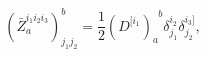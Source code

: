 \begin{equation}
\left( \bar{Z}_{a}^{i_{1}i_{2}i_{3}}\right) _{j_{1}j_{2}}^{b}=\frac{1}{2}%
\left( D^{[i_{1}}\right) _{a}^{\;\;b}\delta _{j_{1}}^{i_{2}}\delta
_{j_{2}}^{i_{3}]},  \label{i21}
\end{equation}

